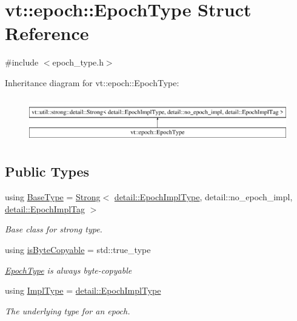 \hypertarget{structvt_1_1epoch_1_1_epoch_type}{}\section{vt\+:\+:epoch\+:\+:Epoch\+Type Struct Reference}
\label{structvt_1_1epoch_1_1_epoch_type}


{\ttfamily \#include $<$epoch\+\_\+type.\+h$>$}

Inheritance diagram for vt\+:\+:epoch\+:\+:Epoch\+Type\+:\begin{figure}[H]
\begin{center}
\leavevmode
\includegraphics[height=1.958042cm]{structvt_1_1epoch_1_1_epoch_type}
\end{center}
\end{figure}
\subsection*{Public Types}
\begin{DoxyCompactItemize}
\item 
using \hyperlink{structvt_1_1epoch_1_1_epoch_type_ae46db92b0cf02c6416ac26e8959947bf}{Base\+Type} = \hyperlink{namespacevt_adbd3338278905742eb2de6db590fd2f1}{Strong}$<$ \hyperlink{namespacevt_1_1epoch_1_1detail_a9adc5df96a521e516dc20511eb553075}{detail\+::\+Epoch\+Impl\+Type}, detail\+::no\+\_\+epoch\+\_\+impl, \hyperlink{structvt_1_1epoch_1_1detail_1_1_epoch_impl_tag}{detail\+::\+Epoch\+Impl\+Tag} $>$
\begin{DoxyCompactList}\small\item\em Base class for strong type. \end{DoxyCompactList}\item 
using \hyperlink{structvt_1_1epoch_1_1_epoch_type_a6cf10baa6f0c733aded770d31d0c09a0}{is\+Byte\+Copyable} = std\+::true\+\_\+type
\begin{DoxyCompactList}\small\item\em {\ttfamily \hyperlink{structvt_1_1epoch_1_1_epoch_type}{Epoch\+Type}} is always byte-\/copyable \end{DoxyCompactList}\item 
using \hyperlink{structvt_1_1epoch_1_1_epoch_type_aef70d29ac80a421e67bc15ffbe9b9e70}{Impl\+Type} = \hyperlink{namespacevt_1_1epoch_1_1detail_a9adc5df96a521e516dc20511eb553075}{detail\+::\+Epoch\+Impl\+Type}
\begin{DoxyCompactList}\small\item\em The underlying type for an epoch. \end{DoxyCompactList}\end{DoxyCompactItemize}
